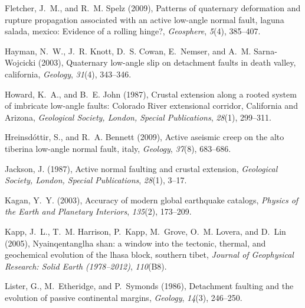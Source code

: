 \documentclass[twocolumn,grl]{AGUTeX}
\begin{document}
\begin{article}
\begin{thebibliography}{25}
Fletcher, J.~M., and R.~M. Spelz (2009), Patterns of quaternary deformation and
  rupture propagation associated with an active low-angle normal fault, laguna
  salada, mexico: Evidence of a rolling hinge?, \textit{Geosphere},
  \textit{5}(4), 385--407.

Hayman, N.~W., J.~R. Knott, D.~S. Cowan, E.~Nemser, and A.~M. Sarna-Wojcicki
  (2003), Quaternary low-angle slip on detachment faults in death valley,
  california, \textit{Geology}, \textit{31}(4), 343--346.

Howard, K.~A., and B.~E. John (1987), Crustal extension along a rooted system
  of imbricate low-angle faults: {Colorado River} extensional corridor,
  {California} and {Arizona}, \textit{Geological Society, London, Special
  Publications}, \textit{28}(1), 299--311.

Hreinsd{\'o}ttir, S., and R.~A. Bennett (2009), Active aseismic creep on the
  alto tiberina low-angle normal fault, italy, \textit{Geology},
  \textit{37}(8), 683--686.

Jackson, J. (1987), Active normal faulting and crustal extension,
  \textit{Geological Society, London, Special Publications}, \textit{28}(1),
  3--17.

Kagan, Y.~Y. (2003), Accuracy of modern global earthquake catalogs,
  \textit{Physics of the Earth and Planetary Interiors}, \textit{135}(2),
  173--209.

Kapp, J.~L., T.~M. Harrison, P.~Kapp, M.~Grove, O.~M. Lovera, and D.~Lin
  (2005), Nyainqentanglha shan: a window into the tectonic, thermal, and
  geochemical evolution of the lhasa block, southern tibet, \textit{Journal of
  Geophysical Research: Solid Earth (1978--2012)}, \textit{110}(B8).

Lister, G., M.~Etheridge, and P.~Symonds (1986), Detachment faulting and the
  evolution of passive continental margins, \textit{Geology}, \textit{14}(3),
  246--250.


\end{thebibliography}
\end{article}
\end{document}
